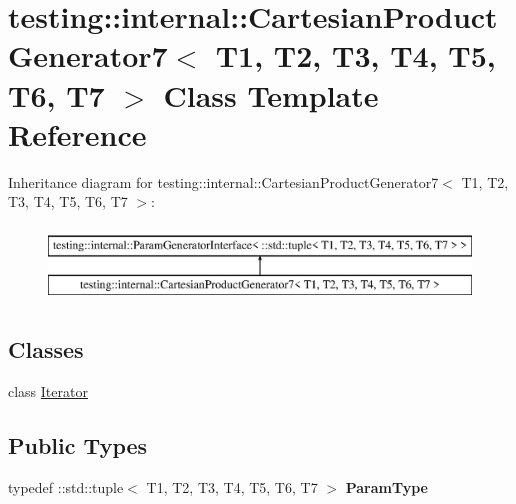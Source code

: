 \hypertarget{classtesting_1_1internal_1_1_cartesian_product_generator7}{}\section{testing\+:\+:internal\+:\+:Cartesian\+Product\+Generator7$<$ T1, T2, T3, T4, T5, T6, T7 $>$ Class Template Reference}
\label{classtesting_1_1internal_1_1_cartesian_product_generator7}
Inheritance diagram for testing\+:\+:internal\+:\+:Cartesian\+Product\+Generator7$<$ T1, T2, T3, T4, T5, T6, T7 $>$\+:\begin{figure}[H]
\begin{center}
\leavevmode
\includegraphics[height=2.000000cm]{classtesting_1_1internal_1_1_cartesian_product_generator7}
\end{center}
\end{figure}
\subsection*{Classes}
\begin{DoxyCompactItemize}
\item 
class \mbox{\hyperlink{classtesting_1_1internal_1_1_cartesian_product_generator7_1_1_iterator}{Iterator}}
\end{DoxyCompactItemize}
\subsection*{Public Types}
\begin{DoxyCompactItemize}
\item 
\mbox{\label{classtesting_1_1internal_1_1_cartesian_product_generator7_a1481728b2ece0109ac7897074d42a1f4}} 
typedef \+::std\+::tuple$<$ T1, T2, T3, T4, T5, T6, T7 $>$ {\bfseries Param\+Type}
\end{DoxyCompactItemize}
